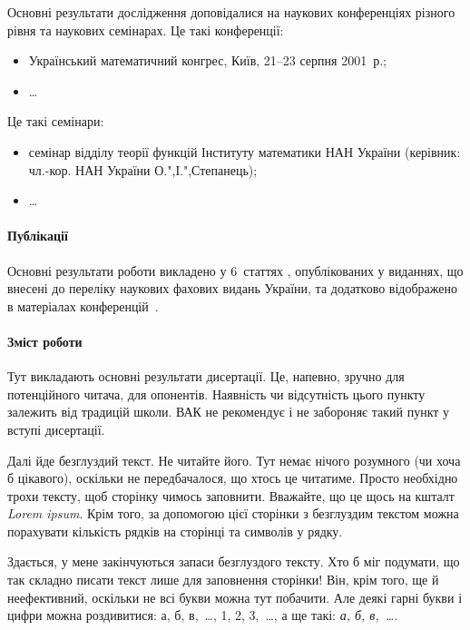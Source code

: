 Основні результати дослідження доповідалися на наукових
конференціях різного рівня та наукових семінарах. Це такі
конференції:
\begin{itemize}
\item Український математичний конгрес, Київ, 21--23 серпня
2001~р.;

\item \ldots
\end{itemize}
Це такі семінари:
\begin{itemize}
\item семінар відділу теорії функцій Інституту математики НАН
України (керівник: чл.-кор. НАН України О.",І.",Степанець);

\item \ldots
\end{itemize}


\paragraph{Публікації}

Основні результати роботи викладено у 6~статтях
\cite{Bar98fasp1,Bar98fasp2}, опублікованих у виданнях, що внесені
до переліку наукових фахових видань України, та додатково
відображено в матеріалах конференцій~\cite{PrB01umc}.


\paragraph{Зміст роботи}

Тут викладають основні результати дисертації. Це, напевно, зручно
для потенційного читача, для опонентів. Наявність чи відсутність
цього пункту залежить від традицій школи. ВАК не рекомендує і не
забороняє такий пункт у вступі дисертації.

Далі йде безглуздий текст. Не читайте його. Тут немає нічого
розумного (чи хоча б цікавого), оскільки не передбачалося, що
хтось це читатиме. Просто необхідно трохи тексту, щоб сторінку
чимось заповнити. Вважайте, що це щось на кшталт \emph{Lorem
ipsum}. Крім того, за допомогою цієї сторінки з безглуздим текстом
можна порахувати кількість рядків на сторінці та символів у рядку.

Здається, у мене закінчуються запаси безглуздого тексту. Хто б міг
подумати, що так складно писати текст лише для заповнення
сторінки! Він, крім того, ще й неефективний, оскільки не всі букви
можна тут побачити. Але деякі гарні букви і цифри можна
роздивитися: а, б, в,~\ldots, 1, 2, 3,~\ldots, а ще такі: \emph{а,
б, в,~\ldots}.

